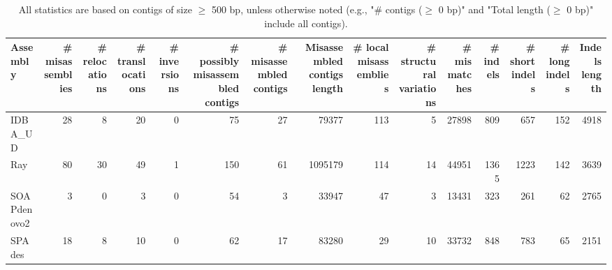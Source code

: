 \documentclass[12pt,a4paper]{article}
\begin{document}
\begin{table}[ht]
\begin{center}
\caption{All statistics are based on contigs of size $\geq$ 500 bp, unless otherwise noted (e.g., "\# contigs ($\geq$ 0 bp)" and "Total length ($\geq$ 0 bp)" include all contigs).}
\begin{tabular}{|l*{14}{|r}|}
\hline
Assembly & \# misassemblies &     \# relocations &     \# translocations &     \# inversions & \# possibly misassembled contigs & \# misassembled contigs & Misassembled contigs length & \# local misassemblies & \# structural variations & \# mismatches & \# indels &     \# short indels &     \# long indels & Indels length \\ \hline
IDBA\_UD & 28 & 8 & 20 & 0 & 75 & 27 & 79377 & 113 & 5 & 27898 & 809 & 657 & 152 & 4918 \\ \hline
Ray & 80 & 30 & 49 & 1 & 150 & 61 & 1095179 & 114 & 14 & 44951 & 1365 & 1223 & 142 & 3639 \\ \hline
SOAPdenovo2 & 3 & 0 & 3 & 0 & 54 & 3 & 33947 & 47 & 3 & 13431 & 323 & 261 & 62 & 2765 \\ \hline
SPAdes & 18 & 8 & 10 & 0 & 62 & 17 & 83280 & 29 & 10 & 33732 & 848 & 783 & 65 & 2151 \\ \hline
\end{tabular}
\end{center}
\end{table}
\end{document}
